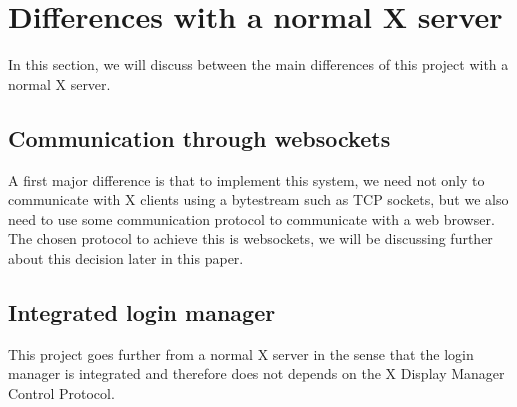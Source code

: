 \section{Differences with a normal X server}
In this section, we will discuss between the main differences of this project 
with a normal X server.
\subsection{Communication through websockets}
A first major difference is that to implement this system, we need 
not only to communicate with X clients using a bytestream such as 
TCP sockets, but we also need to use some communication protocol to 
communicate with a web browser. The chosen protocol to achieve this is 
websockets, we will be discussing further about this decision later in 
this paper.
\subsection{Integrated login manager}
This project goes further from a normal X server in the sense that the 
login manager is integrated and therefore does not depends on the 
X Display Manager Control Protocol.

